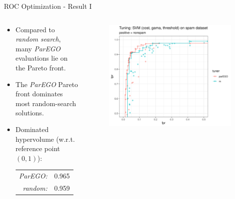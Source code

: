 \documentclass[11pt,compress,t,notes=noshow,xcolor=table]{beamer}
\begin{document}
\begin{vbframe}{ROC Optimization - Result I}

\begin{columns}
\begin{column}{0.45\textwidth}
\begin{itemize}
  \item Compared to \emph{random search}, many \emph{ParEGO} evaluations lie on the Pareto front.
  \item The \emph{ParEGO} Pareto front dominates most random-search solutions.
  \item Dominated hypervolume (w.r.t. reference point $(0,1)$):
  \begin{tabular}{rl}
    \emph{ParEGO:} & 0.965\\
    \emph{random:} & 0.959
  \end{tabular}
\end{itemize}
\end{column}
\begin{column}{0.55\textwidth}
\begin{figure}
\includegraphics[width=\textwidth]{slides/11-multicrit/figure_man/example_parego_spam.png}
\end{figure}
\end{column}
\end{columns}

\end{vbframe}
\end{document}
